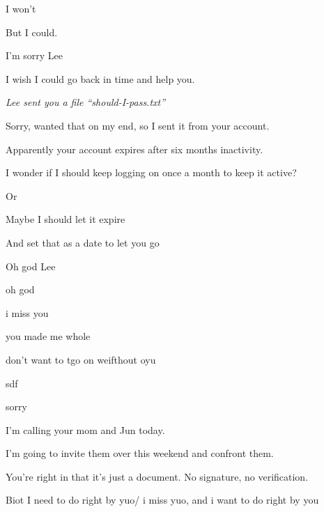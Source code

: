 {\vspace{-1ex}

 I won't

 But I could.

 I'm sorry Lee

 I wish I could go back in time and help you.

\nopagebreak

\begin{flushright}
\emph{Lee sent you a file ``should-I-pass.txt''}
\end{flushright}

 Sorry, wanted that on my end, so I sent it from your account.

 Apparently your account expires after six months inactivity.

 I wonder if I should keep logging on once a month to keep it active?

 Or

 Maybe I should let it expire

 And set that as a date to let you go

 Oh god Lee

 oh god

 i miss you

 you made me whole

 don't want to tgo on weifthout oyu

 sdf

 sorry

\nopagebreak

 I'm calling your mom and Jun today.

 I'm going to invite them over this weekend and confront them.

 You're right in that it's just a document. No signature, no verification.

 Biot I need to do right by yuo/ i miss yuo, and i want to do right by you

}
